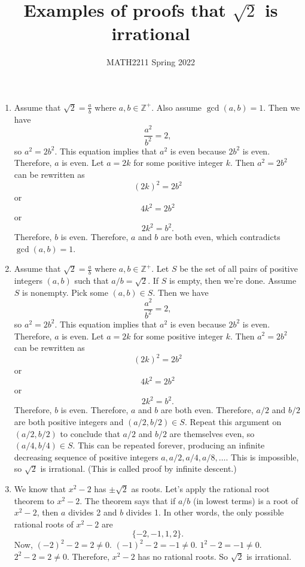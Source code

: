 \documentclass[12pt]{article}
\title{Examples of proofs that $\sqrt{2}$ is irrational}
\author{MATH2211 Spring 2022}
\begin{document}
\maketitle

\begin{enumerate}
    \item Assume that $\sqrt2=\frac{a}{b}$ where $a,b\in\mathbb Z^+$. Also assume $\gcd(a,b)=1$. Then we have
    \[\frac{a^2}{b^2}=2,\]
    so $a^2=2b^2$. This equation implies that $a^2$ is even because $2b^2$ is even. Therefore, $a$ is even. Let $a=2k$ for some positive integer $k$. Then $a^2=2b^2$ can be rewritten as
    \[(2k)^2=2b^2\]
    or
    \[4k^2=2b^2\]
    or
    \[2k^2=b^2.\]
    Therefore, $b$ is even. Therefore, $a$ and $b$ are both even, which contradicts $\gcd(a,b)=1$.

    \item Assume that $\sqrt2=\frac{a}{b}$ where $a,b\in\mathbb Z^+$. Let $S$ be the set of all pairs of positive integers $(a,b)$ such that $a/b=\sqrt2$. If $S$ is empty, then we're done. Assume $S$ is nonempty. Pick some $(a,b)\in S$. Then we have
    \[\frac{a^2}{b^2}=2,\]
    so $a^2=2b^2$. This equation implies that $a^2$ is even because $2b^2$ is even. Therefore, $a$ is even. Let $a=2k$ for some positive integer $k$. Then $a^2=2b^2$ can be rewritten as
    \[(2k)^2=2b^2\]
    or
    \[4k^2=2b^2\]
    or
    \[2k^2=b^2.\]
    Therefore, $b$ is even. Therefore, $a$ and $b$ are both even. Therefore, $a/2$ and $b/2$ are both positive integers and $(a/2, b/2)\in S$. Repeat this argument on $(a/2,b/2)$ to conclude that $a/2$ and $b/2$ are themselves even, so $(a/4,b/4)\in S$. This can be repeated forever, producing an infinite decreasing sequence of positive integers $a, a/2, a/4, a/8, \dots$. This is impossible, so $\sqrt2$ is irrational. (This is called proof by infinite descent.)

    \item We know that $x^2-2$ has $\pm\sqrt2$ as roots. Let's apply the rational root theorem to $x^2-2$. The theorem says that if $a/b$ (in lowest terms) is a root of $x^2-2$, then $a$ divides 2 and $b$ divides 1. In other words, the only possible rational roots of $x^2-2$ are
    \[\{-2,-1,1,2\}.\]
    Now, $(-2)^2-2=2\neq0$. $(-1)^2-2=-1\neq 0$. $1^2-2=-1\neq 0$. $2^2-2=2\neq0$. Therefore, $x^2-2$ has no rational roots. So $\sqrt2$ is irrational.


\end{enumerate}
\end{document}
